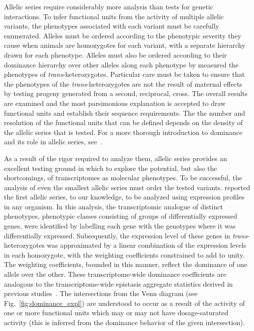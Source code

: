 Allelic series require considerably more analysis than tests for genetic
interactions. To infer functional units from the activity of multiple allelic
variants, the phenotypes associated with each variant must be carefully
enumerated. Alleles must be ordered according to the phenotypic severity they
cause when animals are homozygotes for each variant, with a separate hierarchy
drawn for each phenotype. Alleles must also be ordered according to their
dominance hierarchy over other alleles along each phenotype by measured the
phenotypes of \emph{trans}-heterozygotes. Particular care must be taken to
ensure that the phenotypes of the \emph{trans}-heterozygotes are not the result
of maternal effects by testing progeny generated from a second, reciprocal,
cross. The overall results are examined and the most parsimonious explanation is
accepted to draw functional units and establish their sequence requirements. The
the number and resolution of the functional units that can be defined depends on
the density of the allelic series that is tested. For a more thorough
introduction to dominance and its role in allelic series, see~\citet{Yook2005}.

As a result of the rigor required to analyze them, allelic series provides an
excellent testing ground in which to explore the potential, but also the
shortcomings, of transcriptomes as molecular phenotypes. To be successful, the
analysis of even the smallest allelic series must order the tested variants.
\citet{Angeles-Albores2018b} reported the first allelic series, to our
knowledge, to be analyzed using expression profiles in any organism. In this
analysis, the transcriptomic analogue of distinct phenotypes, phenotypic classes
consisting of groups of differentially expressed genes, were identified by
labelling each gene with the genotypes where it was differentially expressed.
Subsequently, the expression level of these genes in \emph{trans}-heterozygotes
was approximated by a linear combination of the expression levels in each
homozygote, with the weighting coefficients constrained to add to unity. The
weighting coefficients, bounded in this manner, reflect the dominance of one
allele over the other. These transcriptome-wide dominance coefficients are
analogous to the transcriptome-wide epistasis aggregate statistics derived in
previous studies~\citep{Angeles-Albores2018a}. The intersections from the Venn
diagram (see Fig.~\ref{fig:dominance_expl}) are understood to occur as a result
of the activity of one or more functional units which may or may not have
dosage-saturated activity (this is inferred from the dominance behavior of
the given intersection).

